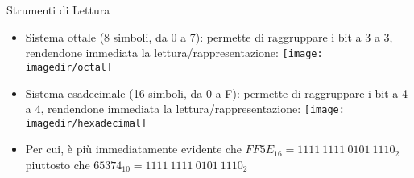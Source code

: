%
%
%
%
%
\setcounter{ms}{1}
\begin{slide}{Strumenti di Lettura}

	\begin{itemize}
	\setlength{\itemsep}{6mm}

		\item Sistema ottale (8 simboli, da 0 a 7):
			  permette di raggruppare i bit a 3 a 3,
			  rendendone immediata la lettura/rappresentazione:
				\texttt{[image: \\imagedir/octal]}

		\item Sistema esadecimale (16 simboli, da 0 a F):
			permette di raggruppare i bit a 4 a 4,
			rendendone immediata la lettura/rappresentazione:
				\texttt{[image: \\imagedir/hexadecimal]}

		\item
			Per cui, \`e pi\`u immediatamente evidente che
			${FF5E}_{16} = {1111~1111~0101~1110}_{2}$
			piuttosto che
			$65374_{10} = {1111~1111~0101~1110}_{2}$

	\end{itemize}

\end{slide}
